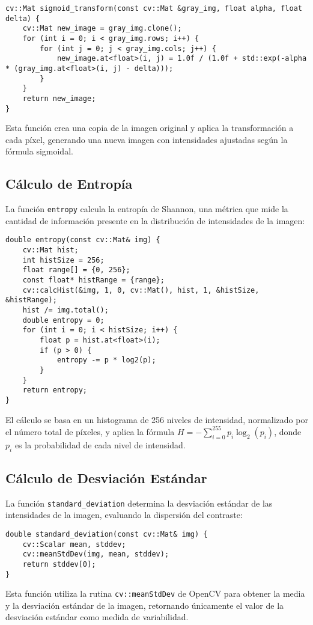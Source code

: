 \begin{lstlisting}[style=cppstyle, caption={Transformación sigmoidal}, label={lst:sigmoid_transform}]
cv::Mat sigmoid_transform(const cv::Mat &gray_img, float alpha, float delta) {
    cv::Mat new_image = gray_img.clone();
    for (int i = 0; i < gray_img.rows; i++) {
        for (int j = 0; j < gray_img.cols; j++) {
            new_image.at<float>(i, j) = 1.0f / (1.0f + std::exp(-alpha * (gray_img.at<float>(i, j) - delta)));
        }
    }
    return new_image;
}
\end{lstlisting}

Esta función crea una copia de la imagen original y aplica la transformación a cada píxel, generando una nueva imagen con intensidades ajustadas según la fórmula sigmoidal.

\subsection{Cálculo de Entropía}
\label{subsec:entropy}

La función \texttt{entropy} calcula la entropía de Shannon, una métrica que mide la cantidad de información presente en la distribución de intensidades de la imagen:

\begin{lstlisting}[style=cppstyle, caption={Cálculo de entropía}, label={lst:entropy}]
double entropy(const cv::Mat& img) {
    cv::Mat hist;
    int histSize = 256;
    float range[] = {0, 256};
    const float* histRange = {range};
    cv::calcHist(&img, 1, 0, cv::Mat(), hist, 1, &histSize, &histRange);
    hist /= img.total();
    double entropy = 0;
    for (int i = 0; i < histSize; i++) {
        float p = hist.at<float>(i);
        if (p > 0) {
            entropy -= p * log2(p);
        }
    }
    return entropy;
}
\end{lstlisting}

El cálculo se basa en un histograma de 256 niveles de intensidad, normalizado por el número total de píxeles, y aplica la fórmula \( H = -\sum_{i=0}^{255} p_i \log_2(p_i) \), donde \(p_i\) es la probabilidad de cada nivel de intensidad.

\subsection{Cálculo de Desviación Estándar}
\label{subsec:stddev}

La función \texttt{standard\_deviation} determina la desviación estándar de las intensidades de la imagen, evaluando la dispersión del contraste:

\begin{lstlisting}[style=cppstyle, caption={Cálculo de desviación estándar}, label={lst:stddev}]
double standard_deviation(const cv::Mat& img) {
    cv::Scalar mean, stddev;
    cv::meanStdDev(img, mean, stddev);
    return stddev[0];
}
\end{lstlisting}

Esta función utiliza la rutina \texttt{cv::meanStdDev} de OpenCV para obtener la media y la desviación estándar de la imagen, retornando únicamente el valor de la desviación estándar como medida de variabilidad.